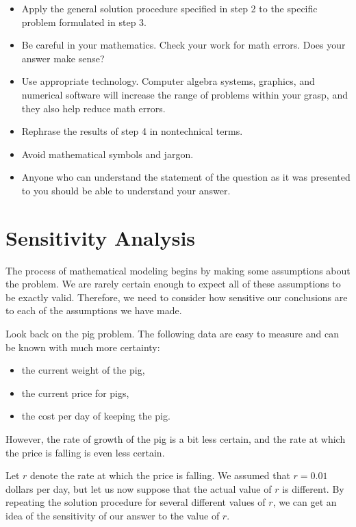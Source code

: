 \vspace{1em}
\hspace{-1.5em}{\bf Step 4. Solve the model.}
\begin{itemize}
\item Apply the general solution procedure specified in step 2 to the specific problem formulated in step 3.
\item Be careful in your mathematics. Check your work for math errors. Does
your answer make sense?
\item Use appropriate technology. Computer algebra systems, graphics, and numerical software will increase the range of problems within your grasp, and they also help reduce math errors.
\end{itemize}

\vspace{1em}
\hspace{-1.5em}{\bf Step 5. Answer the question.}
\begin{itemize}
\item Rephrase the results of step 4 in nontechnical terms.
\item Avoid mathematical symbols and jargon.
\item Anyone who can understand the statement of the question as it was presented to you should be able to understand your answer.
\end{itemize}

\section{Sensitivity Analysis}
The process of mathematical modeling begins by making some assumptions about the problem. We are rarely certain enough to expect all of these assumptions to be exactly valid. Therefore, we need to consider how sensitive our conclusions are to each of the assumptions we have made.

Look back on the pig problem. The following data are easy to measure and can be known with much more certainty:
\begin{itemize}
\item the current weight of the pig,
\item the current price for pigs,
\item the cost per day of keeping the pig.
\end{itemize}
However, the rate of growth of the pig is a bit less certain, and the rate at which the price is falling is even less certain.

Let $r$ denote the rate at which the price is falling. We assumed that $r=0.01$ dollars per day, but let us now suppose that the actual value of $r$ is different. By repeating the solution procedure for several different values of $r$, we can get an idea of the sensitivity of our answer to the value of $r$.

